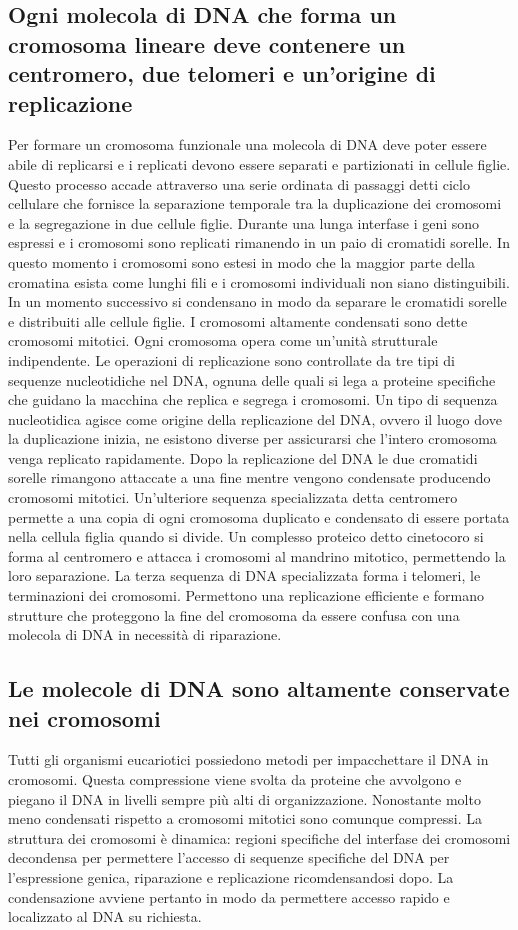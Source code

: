 \subsection{Ogni molecola di DNA che forma un cromosoma lineare deve contenere un centromero, due telomeri e un'origine di replicazione}
Per formare un cromosoma funzionale una molecola di DNA deve poter essere abile di replicarsi e i replicati devono essere separati e partizionati in cellule figlie. Questo processo 
accade attraverso una serie ordinata di passaggi detti ciclo cellulare che fornisce la separazione temporale tra la duplicazione dei cromosomi e la segregazione in due cellule figlie. 
Durante una lunga interfase i geni sono espressi e i cromosomi sono replicati rimanendo in un paio di cromatidi sorelle. In questo momento i cromosomi sono estesi in modo che la maggior
parte della cromatina esista come lunghi fili e i cromosomi individuali non siano distinguibili. In un momento successivo si condensano in modo da separare le cromatidi sorelle e 
distribuiti alle cellule figlie. I cromosomi altamente condensati sono dette cromosomi mitotici. Ogni cromosoma opera come un'unit\`a strutturale indipendente. Le operazioni di 
replicazione sono controllate da tre tipi di sequenze nucleotidiche nel DNA, ognuna delle quali si lega a proteine specifiche che guidano la macchina che replica e segrega i cromosomi.
Un tipo di sequenza nucleotidica agisce come origine della replicazione del DNA, ovvero il luogo dove la duplicazione inizia, ne esistono diverse per assicurarsi che l'intero cromosoma
venga replicato rapidamente. Dopo la replicazione del DNA le due cromatidi sorelle rimangono attaccate a una fine mentre vengono condensate producendo cromosomi mitotici. Un'ulteriore
sequenza specializzata detta centromero permette a una copia di ogni cromosoma duplicato e condensato di essere portata nella cellula figlia quando si divide. Un complesso proteico detto
cinetocoro si forma al centromero e attacca i cromosomi al mandrino mitotico, permettendo la loro separazione. La terza sequenza di DNA specializzata forma i telomeri, le terminazioni 
dei cromosomi. Permettono una replicazione efficiente e formano strutture che proteggono la fine del cromosoma da essere confusa con una molecola di DNA in necessit\`a di riparazione.
\subsection{Le molecole di DNA sono altamente conservate nei cromosomi}
Tutti gli organismi eucariotici possiedono metodi per impacchettare il DNA in cromosomi. Questa compressione viene svolta da proteine che avvolgono e piegano il DNA in livelli sempre 
pi\`u alti di organizzazione. Nonostante molto meno condensati rispetto a cromosomi mitotici sono comunque compressi. La struttura dei cromosomi \`e dinamica: regioni specifiche del
interfase dei cromosomi decondensa per permettere l'accesso di sequenze specifiche del DNA per l'espressione genica, riparazione e replicazione ricomdensandosi dopo. La condensazione 
avviene pertanto in modo da permettere accesso rapido e localizzato al DNA su richiesta.
